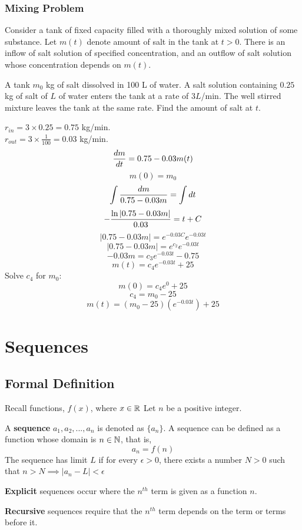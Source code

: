 \documentclass[english, 12pt]{article}
\begin{document}
\subsubsection*{Mixing Problem}
Consider a tank of fixed capacity filled with a thoroughly mixed solution of some substance. Let $m(t)$ denote amount of salt in the tank at $t > 0$. There is an inflow of salt solution of specified concentration, and an outflow of salt solution whose concentration depends on $m(t)$.
\begin{exmp}
A tank $m_{0}$ kg of salt dissolved in 100 L of water. A salt solution containing $0.25$ kg of salt of $L$ of water enters the tank at a rate of $3L$/min. The well stirred mixture leaves the tank at the same rate. Find the amount of salt at $t$.
\begin{sol}
$r_{in} = 3\times 0.25 = 0.75$ kg/min.\\
$r_{out} = 3\times \frac{1}{100} = 0.03$ kg/min.\\
\[\frac{dm}{dt} = 0.75 - 0.03 m(t) \]
\[m(0) = m_{0} \]
\[ \int \frac{dm}{0.75 - 0.03m} = \int dt \]
\[ -\frac{\ln |0.75-0.03m|}{0.03} = t+ C \]
\[ |0.75 - 0.03m| = e^{-0.03C} e^{-0.03t} \]
\[ |0.75 - 0.03m| = e^{c_{2}} e^{-0.03t} \]
\[- 0.03 m = c_{3} e^{-0.03t} - 0.75 \]
\[m(t) = c_{4} e^{-0.03t} + 25 \]
Solve $c_{4}$ for $m_{0}$:
\[m(0) = c_{4} e^0 + 25 \]
\[ c_{4} = m_{0} - 25 \]
\[ m(t) = (m_{0} - 25)(e^{-0.03t}) + 25 \]

\end{sol}
\end{exmp} 
\section{Sequences}
\subsection{Formal Definition}
Recall functions, $f(x)$, where $x \in {\mathbb{R}}$ Let $n$ be a positive integer.
\begin{defn}
A \textbf{sequence} $a_{1},a_{2},...,a_{n}$ is denoted as $\{a_{n}\}$. A sequence can be defined as a function whose domain is $n \in {\mathbb{N}}$, that is, 
\[a_{n} = f(n) \]
The sequence has limit $L$ if for every $\epsilon > 0$, there exists a number $N > 0$ such that $n > N \implies |a_{n} - L | < \epsilon$
\end{defn}
\begin{defn}
\textbf{Explicit} sequences occur where the $n^{th}$ term is given as a function $n$.
\end{defn}
\begin{defn}
\textbf{Recursive} sequences require that the $n^{th}$ term depends on the term or terms before it.
\end{defn}
\end{document}
